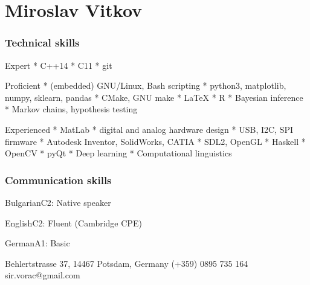 \documentclass{tccv}
\begin{document}
\part{Miroslav Vitkov}


\section{Technical skills}
\begin{factlist}
\item{Expert}
{
     * C++14 \mynext
     * C11   \mynext
     * git
}
\\
\item{Proficient}
{
    * (embedded) GNU/Linux, Bash scripting         \mynext
    * python3, matplotlib, numpy, sklearn, pandas  \mynext
    * CMake, GNU make                              \mynext
    * \LaTeX                                       \mynext
    * R                                            \mynext
    * Bayesian inference                           \mynext
    * Markov chains, hypothesis testing
}
\\
\item{Experienced}
{
    * MatLab                                       \mynext
    * digital and analog hardware design           \mynext
    * USB, I2C, SPI firmware                       \mynext
    * Autodesk Inventor, SolidWorks, CATIA         \mynext
    * SDL2, OpenGL                                 \mynext
    * Haskell                                      \mynext
    * OpenCV                                       \mynext
    * pyQt                                         \mynext
    * Deep learning                                \mynext
    * Computational linguistics
}
\end{factlist}


\section{Communication skills}
\begin{factlist}
\item{Bulgarian}{C2: Native speaker}
\item{English}{C2: Fluent (Cambridge CPE)}
\item{German}{A1: Basic}
\end{factlist}


\personal
    {Behlertstrasse 37,
     14467 Potsdam,     
     Germany}
    {(+359) 0895 735 164}
    {sir.vorac@gmail.com}
\end{document}
